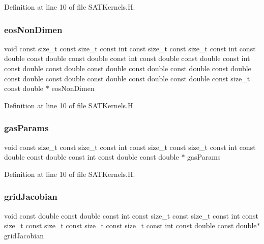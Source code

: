 Definition at line 10 of file S\+A\+T\+Kernels.\+H.

\hypertarget{SATKernels_8H_a4278be352a3267641eaae6198afb804a}{}\label{SATKernels_8H_a4278be352a3267641eaae6198afb804a} 
\subsubsection{\texorpdfstring{eos\+Non\+Dimen}{eosNonDimen}}
{\footnotesize\ttfamily void const size\+\_\+t const size\+\_\+t const int const size\+\_\+t const size\+\_\+t const int const double const double const double const int const double const double const int const double const double const double const double const double const double const double const double const double const double const double const size\+\_\+t const double $\ast$ eos\+Non\+Dimen}



Definition at line 10 of file S\+A\+T\+Kernels.\+H.

\hypertarget{SATKernels_8H_a63fe892dfb364d26ef895affd963a88e}{}\label{SATKernels_8H_a63fe892dfb364d26ef895affd963a88e} 
\subsubsection{\texorpdfstring{gas\+Params}{gasParams}}
{\footnotesize\ttfamily void const size\+\_\+t const size\+\_\+t const int const size\+\_\+t const size\+\_\+t const int const double const double const int const double const double $\ast$ gas\+Params}



Definition at line 10 of file S\+A\+T\+Kernels.\+H.

\hypertarget{SATKernels_8H_aaf1e04690bc21cac2a406748b963e345}{}\label{SATKernels_8H_aaf1e04690bc21cac2a406748b963e345} 
\subsubsection{\texorpdfstring{grid\+Jacobian}{gridJacobian}}
{\footnotesize\ttfamily void const double const double const int const size\+\_\+t const size\+\_\+t const int const size\+\_\+t const size\+\_\+t const size\+\_\+t const size\+\_\+t const int const double const double$\ast$ grid\+Jacobian}



